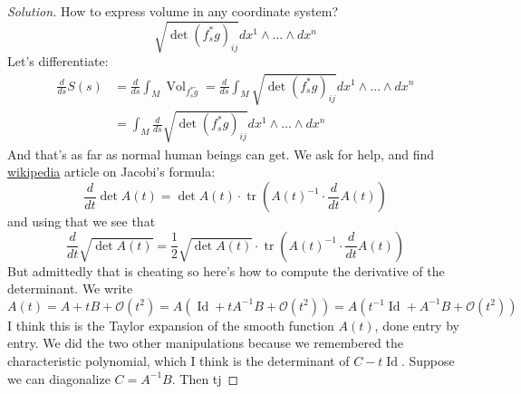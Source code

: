 \begin{proof}[Solution]\leavevmode
How to express volume in any coordinate system?
\[\sqrt{\det (f^* _sg)_{ij}}dx^1\wedge\ldots\wedge dx^n\]
Let's differentiate:
\begin{align*}
	\frac{d}{ds}S(s)&=\frac{d}{ds}\int_M\operatorname{Vol}_{f^*_s\tilde{g}}=\frac{d}{ds}\int_M \sqrt{\det (f^* _sg)_{ij}}dx^1\wedge\ldots\wedge dx^n\\
&=\int_M \frac{d}{ds}\sqrt{\det (f^* _sg)_{ij}}dx^1\wedge\ldots\wedge dx^n
\end{align*}
And that's as far as normal human beings can get. We ask for help, and find
\href{https://en.wikipedia.org/wiki/Jacobi%27s_formula}{wikipedia} article on Jacobi's formula:
	\[\boxed{\frac{d}{dt}\det A(t)=\det A(t) \cdot \operatorname{tr}\left(A(t)^{-1}\cdot \frac{d}{dt}A(t)\right)}\]
and using that we see that
\[\boxed{\frac{d}{dt}\sqrt{\det A(t)} =\frac{1}{2}\sqrt{\det A(t)} \cdot\operatorname{tr}\left(A(t)^{-1}\cdot \frac{d}{dt}A(t)\right) }\]
But admittedly that is cheating so here's how to compute the derivative of the determinant. We write
\[A(t)=A+tB+\mathcal{O}(t^2)=A(\operatorname{Id}+tA^{-1}B+\mathcal{O}(t^2))=A(t^{-1}\operatorname{Id}+A^{-1}B+\mathcal{O}(t^2))\]
I think this is the Taylor expansion of the smooth function \(A(t)\), done entry by entry. We did the two other manipulations because we remembered the characteristic polynomial, which I think is the determinant of \(C-t \operatorname{Id}\). Suppose we can diagonalize \(C=A^{-1}B\). Then tj



\end{proof}
